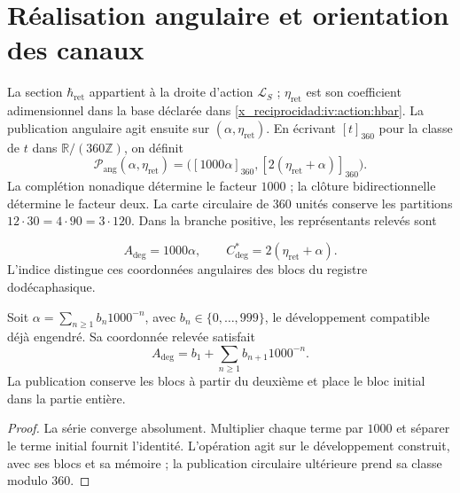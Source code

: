 \section{Réalisation angulaire et orientation des canaux}
\label{x_reciprocidad:iv:angular:section}

La section \(\hbar_{\mathrm{ret}}\) appartient à la droite
d’action \(\mathcal L_S\) ; \(\eta_{\mathrm{ret}}\) est son
coefficient adimensionnel dans la base déclarée dans
\eqref{x_reciprocidad:iv:action:hbar}. La publication angulaire agit ensuite
sur \((\alpha,\eta_{\mathrm{ret}})\). En écrivant
\([t]_{360}\) pour la classe de \(t\) dans
\(\mathbb R/(360\mathbb Z)\), on définit
\begin{equation}
 \mathcal P_{\mathrm{ang}}(\alpha,\eta_{\mathrm{ret}})
 =\bigl([1000\alpha]_{360},
        [2(\eta_{\mathrm{ret}}+\alpha)]_{360}\bigr).
 \label{x_reciprocidad:iv:angular:publicacion}
\end{equation}
La complétion nonadique détermine le facteur \(1000\) ; la
clôture bidirectionnelle détermine le facteur deux. La carte circulaire
de \(360\) unités conserve les partitions
\(12\cdot30=4\cdot90=3\cdot120\). Dans la branche positive, les
représentants relevés sont

\begin{equation}
 A_{\deg}=1000\alpha,\qquad
 C^*_{\deg}=2(\eta_{\mathrm{ret}}+\alpha).
 \label{x_reciprocidad:iv:angular:representantes}
\end{equation}
L’indice distingue ces coordonnées angulaires des blocs
du registre dodécaphasique.

\begin{proposition}
\label{x_reciprocidad:iv:angular:desplazamiento}
Soit \(\alpha=\sum_{n\geq1}b_n1000^{-n}\), avec
\(b_n\in\{0,\ldots,999\}\), le développement compatible déjà
engendré. Sa coordonnée relevée satisfait
\[
 A_{\deg}=b_1+\sum_{n\geq1}b_{n+1}1000^{-n}.
\]
La publication conserve les blocs à partir du deuxième et
place le bloc initial dans la partie entière.
\end{proposition}
\begin{proof}
La série converge absolument. Multiplier chaque terme par
\(1000\) et séparer le terme initial fournit l’identité.
L’opération agit sur le développement construit, avec ses
blocs et sa mémoire ; la publication circulaire ultérieure prend
sa classe modulo \(360\).

\end{proof}

